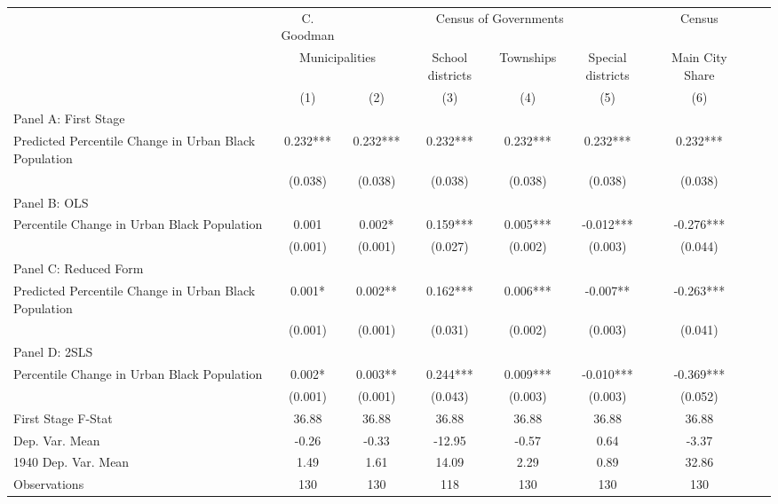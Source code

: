  \begin{tabular}{l*{8}{c}} \toprule
&\multicolumn{1}{c}{C. Goodman}&\multicolumn{4}{c}{Census of Governments}&\multicolumn{1}{c}{Census}\\\cmidrule(lr){2-2}\cmidrule(lr){3-6}\cmidrule(lr){7-7}
&\multicolumn{2}{c}{Municipalities}&\multicolumn{1}{c}{School districts}&\multicolumn{1}{c}{Townships}&\multicolumn{1}{c}{Special districts}&\multicolumn{1}{c}{Main City Share}\\\cmidrule(lr){2-3}\cmidrule(lr){4-6}\cmidrule(lr){7-7}
&\multicolumn{1}{c}{(1)}&\multicolumn{1}{c}{(2)}&\multicolumn{1}{c}{(3)}&\multicolumn{1}{c}{(4)}&\multicolumn{1}{c}{(5)}&\multicolumn{1}{c}{(6)}\\
\cmidrule(lr){1-7}
\multicolumn{6}{l}{Panel A: First Stage}\\
\cmidrule(lr){1-7}
Predicted Percentile Change in Urban Black Population&    0.232***&    0.232***&    0.232***&    0.232***&    0.232***&    0.232***\\
                &  (0.038)   &  (0.038)   &  (0.038)   &  (0.038)   &  (0.038)   &  (0.038)   \\
\cmidrule(lr){1-7}
\multicolumn{6}{l}{Panel B: OLS}\\
\cmidrule(lr){1-7}
Percentile Change in Urban Black Population&    0.001   &    0.002*  &    0.159***&    0.005***&   -0.012***&   -0.276***\\
                &  (0.001)   &  (0.001)   &  (0.027)   &  (0.002)   &  (0.003)   &  (0.044)   \\
\cmidrule(lr){1-7}
\multicolumn{6}{l}{Panel C: Reduced Form}\\
\cmidrule(lr){1-7}
Predicted Percentile Change in Urban Black Population&    0.001*  &    0.002** &    0.162***&    0.006***&   -0.007** &   -0.263***\\
                &  (0.001)   &  (0.001)   &  (0.031)   &  (0.002)   &  (0.003)   &  (0.041)   \\
\cmidrule(lr){1-7}
\multicolumn{6}{l}{Panel D: 2SLS}\\
\cmidrule(lr){1-7}
Percentile Change in Urban Black Population&    0.002*  &    0.003** &    0.244***&    0.009***&   -0.010***&   -0.369***\\
                &  (0.001)   &  (0.001)   &  (0.043)   &  (0.003)   &  (0.003)   &  (0.052)   \\
\midrule
First Stage F-Stat&    36.88   &    36.88   &    36.88   &    36.88   &    36.88   &    36.88   \\
Dep. Var. Mean  &    -0.26   &    -0.33   &   -12.95   &    -0.57   &     0.64   &    -3.37   \\
1940 Dep. Var. Mean&     1.49   &     1.61   &    14.09   &     2.29   &     0.89   &    32.86   \\
Observations    &      130   &      130   &      118   &      130   &      130   &      130   \\
 \bottomrule \end{tabular}
